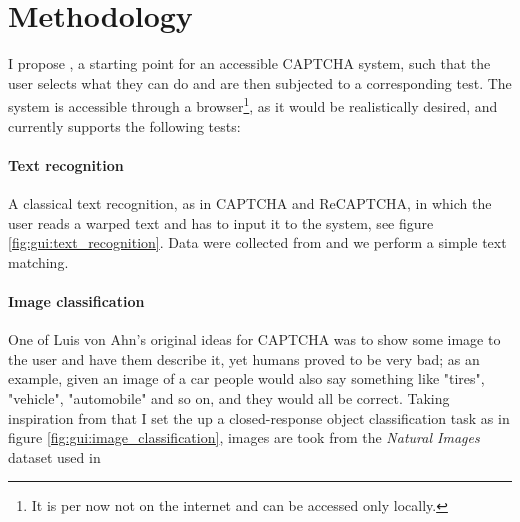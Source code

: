 \section{Methodology}
I propose \name, a starting point for an accessible CAPTCHA system, such that the user selects what they can do and are then subjected to a corresponding test.
The system is accessible through a browser\footnote{It is per now not on the internet and can be accessed only locally.}, as it would be realistically desired, and currently supports the following tests:

\paragraph{Text recognition}
A classical text recognition, as in CAPTCHA and ReCAPTCHA, in which the user reads a warped text and has to input it to the system, see figure \ref{fig:gui:text_recognition}.
Data were collected from \cite{wilhemy2013dataset,gregwar2022captcha} and we perform a simple text matching.

\paragraph{Image classification}
One of Luis von Ahn's original ideas for CAPTCHA was to show some image to the user and have them describe it, yet humans proved to be very bad; as an example, given an image of a car people would also say something like "tires", "vehicle", "automobile" and so on, and they would all be correct.
Taking inspiration from that I set the up a closed-response object classification task as in figure \ref{fig:gui:image_classification}, images are took from the \emph{Natural Images} dataset used in \cite{roy2018deep}


